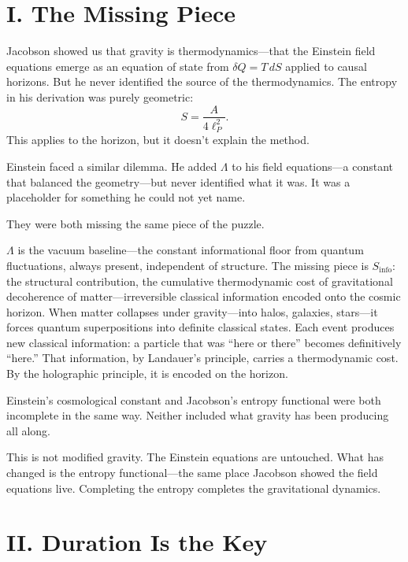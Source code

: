 \documentclass[12pt]{article}
\begin{document}
\section*{I. The Missing Piece}

Jacobson showed us that gravity is thermodynamics---that the Einstein
field equations emerge as an equation of state from $\delta Q = T\,dS$
applied to causal horizons.  But he never identified the source of the
thermodynamics.  The entropy in his derivation was purely geometric:
\begin{equation}
S = \frac{A}{4\ell_P^2}.
\end{equation}
This applies to the horizon, but it doesn't explain the method.

Einstein faced a similar dilemma.  He added $\Lambda$ to his field
equations---a constant that balanced the geometry---but never identified
what it was.  It was a placeholder for something he could not yet name.

They were both missing the same piece of the puzzle.

$\Lambda$ is the vacuum baseline---the constant informational floor from
quantum fluctuations, always present, independent of structure.  The
missing piece is $S_{\mathrm{info}}$: the structural contribution, the
cumulative thermodynamic cost of gravitational decoherence of matter---irreversible
classical information encoded onto the cosmic horizon.
When matter collapses under gravity---into halos, galaxies, stars---it
forces quantum superpositions into definite classical states.  Each event
produces new classical information: a particle that was ``here or there''
becomes definitively ``here.''  That information, by Landauer's principle,
carries a thermodynamic cost.  By the holographic principle, it is encoded
on the horizon.

Einstein's cosmological constant and Jacobson's entropy functional were
both incomplete in the same way.  Neither included what gravity has been
producing all along.

This is not modified gravity.  The Einstein equations are untouched.  What
has changed is the entropy functional---the same place Jacobson showed the
field equations live.  Completing the entropy completes the gravitational
dynamics.


\section*{II. Duration Is the Key}
\end{document}
